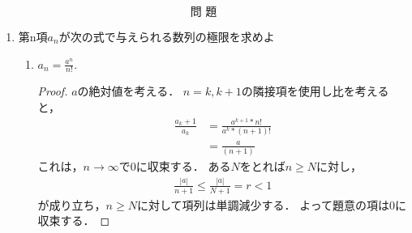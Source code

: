 \documentclass{ltjsarticle}
\theoremstyle{definition}
\theoremstyle{propcorollarystyle}
\theoremstyle{thmcorollarystyle}
\begin{document}
\[
\textbf{問 題}
\]
\begin{enumerate}[label={\arabic*}),itemsep=1em]
  \item 第n項$a_n$が次の式で与えられる数列の極限を求めよ
  \begin{enumerate}[label=({\roman*}),itemsep=1pt,parsep=0pt]
    \item $a_n = \frac{a^n}{n!}$.
      \begin{proof}
        $a$の絶対値を考える．
        $n=k, k+1$の隣接項を使用し比を考えると，
        \[
        \begin{aligned}
          \frac{a_k+1}{a_k} &= \frac{a^{k+1}*n!}{a^k*(n+1)!} \\
          &= \frac{a}{(n+1)}
        \end{aligned}
        \]
        これは，$n\rightarrow \infty$で0に収束する．
        ある$N$をとれば$n\ge N$に対し，
        \begin{align*}
          \frac{|a|}{n+1}\le \frac{|a|}{N+1}=r<1
        \end{align*}
        が成り立ち，$n\ge N$に対して項列は単調減少する．
        よって題意の項は0に収束する．
      \end{proof}


\end{enumerate}
\end{enumerate}
\end{document}
